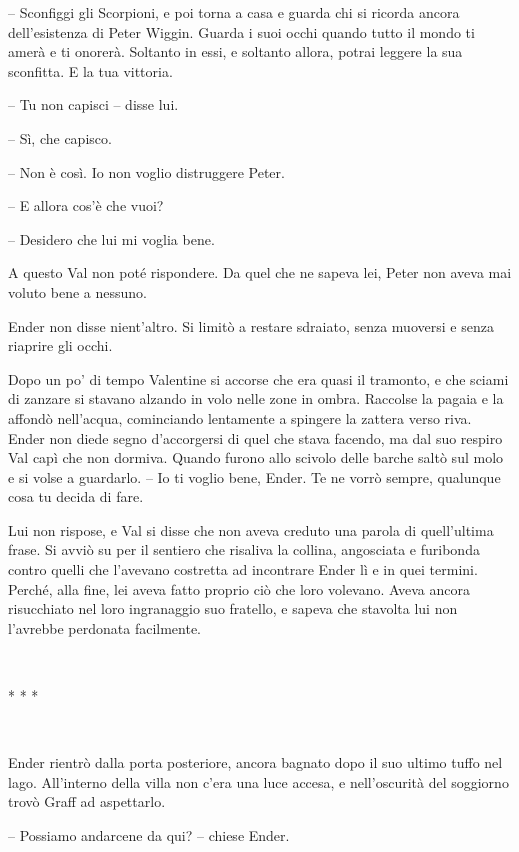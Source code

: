 {-- Sconfiggi gli Scorpioni, e poi torna a casa e guarda chi si ricorda
	ancora dell'esistenza di Peter Wiggin. Guarda i suoi occhi quando tutto
	il mondo ti amerà e ti onorerà. Soltanto in essi, e soltanto allora,
	potrai leggere la sua sconfitta. E la tua vittoria.}

{-- Tu non capisci -- disse lui.}

{-- Sì, che capisco.}

{-- Non è così. Io non voglio distruggere Peter.}

{-- E allora cos'è che vuoi?}

{-- Desidero che lui mi voglia bene.}

{A questo Val non poté rispondere. Da quel che ne sapeva lei, Peter non
	aveva mai voluto bene a nessuno.}

{Ender non disse nient'altro. Si limitò a restare sdraiato, senza
	muoversi e senza riaprire gli occhi.}

{Dopo un po' di tempo Valentine si accorse che era quasi il tramonto, e
	che sciami di zanzare si stavano alzando in volo nelle zone in ombra.
	Raccolse la pagaia e la affondò nell'acqua, cominciando lentamente a
	spingere la zattera verso riva. Ender non diede segno d'accorgersi di
	quel che stava facendo, ma dal suo respiro Val capì che non dormiva.
	Quando furono allo scivolo delle barche saltò sul molo e si volse a
	guardarlo. -- Io ti voglio bene, Ender. Te ne vorrò sempre, qualunque
	cosa tu decida di fare.}

{Lui non rispose, e Val si disse che non aveva creduto una parola di
	quell'ultima frase. Si avviò su per il sentiero che risaliva la collina,
	angosciata e furibonda contro quelli che l'avevano costretta ad
	incontrare Ender lì e in quei termini. Perché, alla fine, lei aveva
	fatto proprio ciò che loro volevano. Aveva ancora risucchiato nel loro
	ingranaggio suo fratello, e sapeva che stavolta lui non l'avrebbe
	perdonata facilmente.}

{~}

\begin{center}
	{* * *}
\end{center}

{~}

{Ender rientrò dalla porta posteriore, ancora bagnato dopo il suo ultimo
	tuffo nel lago. All'interno della villa non c'era una luce accesa, e
	nell'oscurità del soggiorno trovò Graff ad aspettarlo.}

{-- Possiamo andarcene da qui? -- chiese Ender.}

